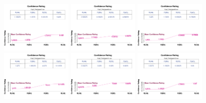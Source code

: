 \begin{figure}[th]
\includegraphics[width=0.30\textwidth]{Figures/MirrorRating_Exp2_P7} \includegraphics[width=0.30\textwidth]{Figures/MirrorRating_Exp2_P8} \includegraphics[width=0.30\textwidth]{Figures/MirrorRating_Exp2_P9}
\includegraphics[width=0.30\textwidth]{Figures/MirrorRating_Exp2_P10} \includegraphics[width=0.30\textwidth]{Figures/MirrorRating_Exp2_P11} \includegraphics[width=0.30\textwidth]{Figures/MirrorRating_Exp2_P12}

\end{figure}
